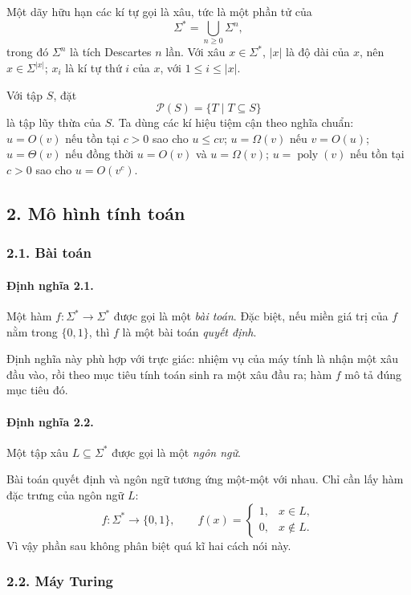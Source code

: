 \documentclass[11pt]{article}
\begin{document}
Một dãy hữu hạn các kí tự gọi là xâu, tức là một phần tử của
\[
  \Sigma^*=\bigcup_{n\ge 0}\Sigma^n,
\]
trong đó \(\Sigma^n\) là tích Descartes \(n\) lần. Với xâu \(x\in\Sigma^*\),
\(|x|\) là độ dài của \(x\), nên \(x\in\Sigma^{|x|}\); \(x_i\) là kí tự thứ
\(i\) của \(x\), với \(1\le i\le |x|\).

Với tập \(S\), đặt
\[
  \mathcal P(S)=\{T\mid T\subseteq S\}
\]
là tập lũy thừa của \(S\). Ta dùng các kí hiệu tiệm cận theo nghĩa chuẩn:
\(u=O(v)\) nếu tồn tại \(c>0\) sao cho \(u\le cv\); \(u=\Omega(v)\) nếu
\(v=O(u)\); \(u=\Theta(v)\) nếu đồng thời \(u=O(v)\) và \(u=\Omega(v)\);
\(u=\operatorname{poly}(v)\) nếu tồn tại \(c>0\) sao cho \(u=O(v^c)\).

\subsection*{2. Mô hình tính toán}

\subsubsection*{2.1. Bài toán}

\paragraph{Định nghĩa 2.1.}
Một hàm \(f:\Sigma^*\to\Sigma^*\) được gọi là một \emph{bài toán}. Đặc biệt,
nếu miền giá trị của \(f\) nằm trong \(\{0,1\}\), thì \(f\) là một bài toán
\emph{quyết định}.

Định nghĩa này phù hợp với trực giác: nhiệm vụ của máy tính là nhận một xâu đầu
vào, rồi theo mục tiêu tính toán sinh ra một xâu đầu ra; hàm \(f\) mô tả đúng
mục tiêu đó.

\paragraph{Định nghĩa 2.2.}
Một tập xâu \(L\subseteq\Sigma^*\) được gọi là một \emph{ngôn ngữ}.

Bài toán quyết định và ngôn ngữ tương ứng một-một với nhau. Chỉ cần lấy hàm đặc
trưng của ngôn ngữ \(L\):
\[
  f:\Sigma^*\to\{0,1\},\qquad
  f(x)=
  \begin{cases}
    1,& x\in L,\\
    0,& x\notin L.
  \end{cases}
\]
Vì vậy phần sau không phân biệt quá kĩ hai cách nói này.

\subsubsection*{2.2. Máy Turing}
\end{document}
